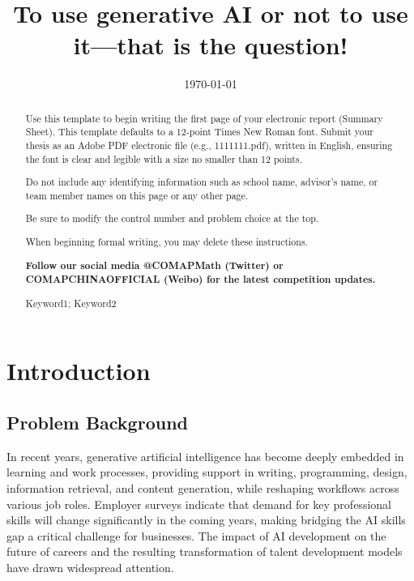 \documentclass{mcmthesis}
\title{To use generative AI or not to use it—that is the question!}
\date{\today}
\begin{document}
\begin{abstract}
\par Use this template to begin writing the first page of your electronic report (Summary Sheet). This template defaults to a 12-point Times New Roman font. Submit your thesis as an Adobe PDF electronic file (e.g., 1111111.pdf), written in English, ensuring the font is clear and legible with a size no smaller than 12 points.

Do not include any identifying information such as school name, advisor's name, or team member names on this page or any other page.

Be sure to modify the control number and problem choice at the top.

When beginning formal writing, you may delete these instructions.

\textbf{Follow our social media @COMAPMath (Twitter) or COMAPCHINAOFFICIAL (Weibo) for the latest competition updates.}

\begin{keywords}
Keyword1; Keyword2
\end{keywords}
\end{abstract}



\maketitle
\tableofcontents
\newpage



\section{Introduction}

\subsection{Problem Background}
\noindent In recent years, generative artificial intelligence has become deeply embedded in learning and work processes, providing support in writing, programming, design, information retrieval, and content generation, while reshaping workflows across various job roles. Employer surveys indicate that demand for key professional skills will change significantly in the coming years, making bridging the AI skills gap a critical challenge for businesses. The impact of AI development on the future of careers and the resulting transformation of talent development models have drawn widespread attention.
\end{document}
